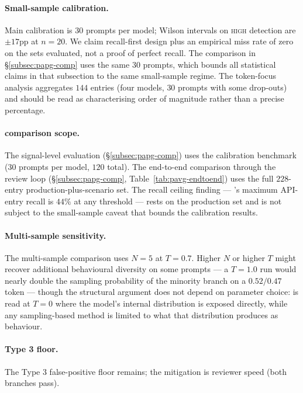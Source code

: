 \paragraph{Small-sample calibration.} Main calibration is $30$
prompts per model; Wilson intervals on \textsc{high} detection are
$\pm 17$pp at $n=20$. We claim recall-first design plus an empirical
miss rate of zero on the sets evaluated, not a proof of perfect
recall. The \papg comparison in \S\ref{subsec:papg-comp} uses the
same $30$ prompts, which bounds all statistical claims in that
subsection to the same small-sample regime. The token-focus
analysis aggregates $144$ entries (four models, $30$ prompts with
some drop-outs) and should be read as characterising order of
magnitude rather than a precise percentage.

\paragraph{\papg comparison scope.} The signal-level \papg evaluation
(\S\ref{subsec:papg-comp}) uses the calibration benchmark ($30$
prompts per model, $120$ total). The end-to-end comparison through
the review loop (\S\ref{subsec:papg-comp}, Table~\ref{tab:pavg-endtoend})
uses the full $228$-entry production-plus-scenario set. The recall
ceiling finding --- \papg's maximum API-entry recall is $44\%$ at
any threshold --- rests on the production set and is not subject to
the small-sample caveat that bounds the calibration results.

\paragraph{Multi-sample sensitivity.} The multi-sample comparison
uses $N=5$ at $T=0.7$. Higher $N$ or higher $T$ might recover
additional behavioural diversity on some prompts --- a $T=1.0$ run
would nearly double the sampling probability of the minority branch
on a $0.52/0.47$ token --- though the structural argument does not
depend on parameter choice: \eps is read at $T=0$ where the model's
internal distribution is exposed directly, while any sampling-based
method is limited to what that distribution produces as behaviour.

\paragraph{Type 3 floor.} The Type 3 false-positive floor remains;
the mitigation is reviewer speed (both branches pass).

